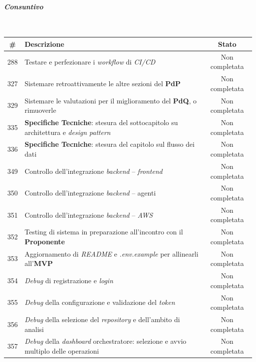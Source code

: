 \documentclass[12pt, a4paper]{article}
\begin{document}
{\newpage
\paragraph{\textit{Consuntivo}}~

\begin{table}[H]
    \centering
    \renewcommand{\arraystretch}{1.3}
    \begin{tabularx}{\textwidth}{|c|X|c|}
        \hline
        \textbf{\#} & \textbf{Descrizione} & \textbf{Stato} \\ \hline
        288 & Testare e perfezionare i \textit{workflow} di \textit{CI/CD} & Non completata \\ \hline
        327 & Sistemare retroattivamente le altre sezioni del \textbf{PdP} & Non completata \\ \hline
        329 & Sistemare le valutazioni per il miglioramento del \textbf{PdQ}, o rimuoverle & Non completata \\ \hline
        335 & \textbf{Specifiche Tecniche}: stesura del sottocapitolo su architettura e \textit{design pattern} & Non completata \\ \hline
        336 & \textbf{Specifiche Tecniche}: stesura del capitolo sul flusso dei dati & Non completata \\ \hline
        349 & Controllo dell'integrazione \textit{backend} -- \textit{frontend} & Non completata \\ \hline
        350 & Controllo dell'integrazione \textit{backend} -- agenti & Non completata \\ \hline
        351 & Controllo dell'integrazione \textit{backend} -- \textit{AWS} & Non completata \\ \hline
        352 & Testing di sistema in preparazione all'incontro con il \textbf{Proponente} & Non completata \\ \hline
        353 & Aggiornamento di \textit{README} e \textit{.env.example} per allinearli all'\textbf{MVP} & Non completata \\ \hline
        354 & \textit{Debug} di registrazione e \textit{login} & Non completata \\ \hline
        355 & \textit{Debug} della configurazione e validazione del \textit{token} & Non completata \\ \hline
        356 & \textit{Debug} della selezione del \textit{repository} e dell'ambito di analisi & Non completata \\ \hline
        357 & \textit{Debug} della \textit{dashboard} orchestratore: selezione e avvio multiplo delle operazioni & Non completata \\ \hline

\end{tabularx}
\end{table}}
\end{document}
